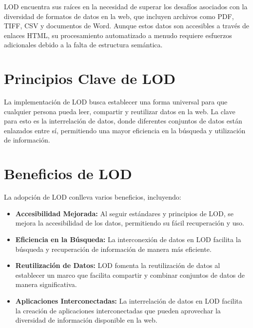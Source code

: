 \documentclass[11pt]{report}
\begin{document}
		LOD encuentra sus raíces en la necesidad de superar los desafíos asociados con la diversidad de formatos de datos en la web, que incluyen archivos como PDF, TIFF, CSV y documentos de Word. Aunque estos datos son accesibles a través de enlaces HTML, su procesamiento automatizado a menudo requiere esfuerzos adicionales debido a la falta de estructura semántica.

		\section{Principios Clave de LOD}

		La implementación de LOD busca establecer una forma universal para que cualquier persona pueda leer, compartir y reutilizar datos en la web. La clave para esto es la interrelación de datos, donde diferentes conjuntos de datos están enlazados entre sí, permitiendo una mayor eficiencia en la búsqueda y utilización de información.

		\section{Beneficios de LOD}

		La adopción de LOD conlleva varios beneficios, incluyendo:

		\begin{itemize}
		\item \textbf{Accesibilidad Mejorada:} Al seguir estándares y principios de LOD, se mejora la accesibilidad de los datos, permitiendo su fácil recuperación y uso.
		
		\item \textbf{Eficiencia en la Búsqueda:} La interconexión de datos en LOD facilita la búsqueda y recuperación de información de manera más eficiente.
		
		\item \textbf{Reutilización de Datos:} LOD fomenta la reutilización de datos al establecer un marco que facilita compartir y combinar conjuntos de datos de manera significativa.
		
		\item \textbf{Aplicaciones Interconectadas:} La interrelación de datos en LOD facilita la creación de aplicaciones interconectadas que pueden aprovechar la diversidad de información disponible en la web.
		\end{itemize}
\end{document}
